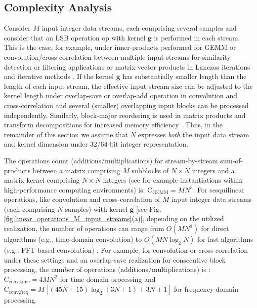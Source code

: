\documentclass[twocolumn,english,onecolumn]{IEEEtran}
\theoremstyle{plain}
\theoremstyle{plain}
\begin{document}
\subsection{Complexity Analysis}

Consider $M$ input integer data streams, each comprising several
samples and consider that an LSB operation $\text{op}$ with kernel
$\mathbf{g}$ is performed in each stream. This is the case, for example,
under inner-products performed for GEMM or convolution/cross-correlation
between multiple input streams for similarity detection or filtering
applications or matrix-vector products in Lanczos iterations and iterative
methods \cite{golub1996matrix}. If the kernel $\mathbf{g}$ has substantially
smaller length than the length of each input stream, the effective
input stream size can be adjusted to the kernel length under overlap-save
or overlap-add operation in convolution and cross-correlation \cite{anam2012throughput}
and several (smaller) overlapping input blocks can be processed independently.
Similarly, block-major reordering is used in matrix products and transform
decompositions for increased memory efficiency \cite{anastasia2012throughput,goto2008anatomy,intel2007intel,andreopoulos2001local,andreopoulos2002new,andreopoulos2003high}.
Thus, in the remainder of this section we assume that $N$ expresses
\emph{both} the input data stream and kernel dimension under 32/64-bit
integer representation.

The operations count (additions/multiplications) for stream-by-stream
sum-of-products between a matrix comprising $M$ subblocks of $N\times N$
integers and a matrix kernel comprising $N\times N$ integers (see
\cite{anastasia2012throughput,goto2008anatomy,murray2008spread,chen2005fault}
for example instantiations within high-performance computing environments)
is: $\mathrm{C}_{\text{GEMM}}=MN^{3}$. For sesquilinear operations,
like convolution and cross-correlation of $M$ input integer data
streams (each comprising $N$ samples) with kernel $\mathbf{g}$ {[}see
Fig. \ref{fig:linear_operations_M_input_streams}(a){]}, depending
on the utilized realization, the number of operations can range from
$O\left(MN^{2}\right)$ for direct algorithms (e.g., time-domain convolution)
to $O\left(MN\log_{2}N\right)$ for fast algorithms (e.g., FFT-based
convolution) \cite{anam2012throughput}. For example, for convolution
or cross-correlation under these settings and an overlap-save realization
for consecutive block processing, the number of operations (additions/multiplications)
is \cite{anam2012throughput}: $\mathrm{C}_{\text{conv,time}}=4MN^{2}$
for time domain processing and $\mathrm{C}_{\text{conv,freq}}=M\left[\left(45N+15\right)\log_{2}\left(3N+1\right)+3N+1\right]$
for frequency-domain processing. 
\end{document}
